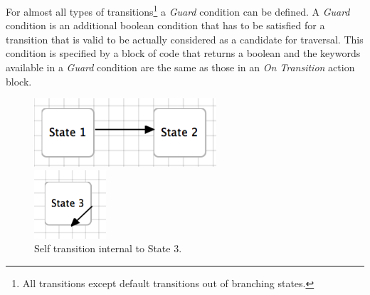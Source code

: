 \documentclass[11pt]{amsart}
\begin{document}
For almost all types of transitions\footnote{All transitions except default transitions out of branching states.} a \emph{Guard} condition can be defined. A \emph{Guard} condition is an additional boolean condition that has to be satisfied for a transition that is valid to be actually considered as a candidate for traversal. This condition is specified by a block of code that returns a boolean and the keywords available in a \emph{Guard} condition are the same as those in an \emph{On Transition} action block.



\begin{figure}

\begin{minipage}{.5\textwidth}
\begin{center}
\vspace{.2in}
\centerline {
\includegraphics[height=1in]{StatechartsImages/RegularTransition.png}
}
\caption{Regular transition between State 1 and State 2.}
\label{fig:regularTransition}
\end{center}
\end{minipage}%
\begin{minipage}{.5\textwidth}
\begin{center}
\vspace{.2in}
\centerline {
\includegraphics[height=1in]{StatechartsImages/SelfTransition.png}
}
\caption{Self transition internal to State 3.}
\label{fig:selfTransition}
\end{center}
\end{minipage}

\end{figure}
\end{document}
